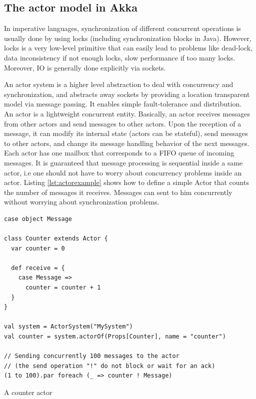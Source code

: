 \subsection{The actor model in Akka}

In imperative languages, synchronization of different concurrent operations is usually done by using locks (including synchronization blocks in Java). 
However, locks is a very low-level primitive that can easily lead to problems like dead-lock, data inconsistency if not enough locks, 
slow performance if too many locks. Moreover, IO is generally done explicitly via sockets.

An actor system is a higher level abstraction to deal with concurrency and synchronization, and abstracts away sockets by providing a location transparent model
via message passing. It enables simple fault-tolerance and distribution.
\\

An actor is a lightweight concurrent entity. Basically, an actor receives messages from other actors and send messages to other actors. Upon the reception of 
a message, it can modify its internal state (actors can be stateful), send messages to other actors, and change its message handling behavior of the next messages.
Each actor has one mailbox that corresponds to a FIFO queue of incoming messages.
It is guaranteed that message processing is sequential inside a same actor, i.e one should not have to worry about concurrency problems inside an actor. Listing
\ref{lst:actorexample} shows how to define a simple Actor that counts the number of messages it receives. Messages can sent to him concurrently without worrying
about synchronization problems.

\begin{listing}[h]
\begin{verbatim}
case object Message

class Counter extends Actor {
  var counter = 0

  def receive = {
    case Message => 
      counter = counter + 1
  }
}

val system = ActorSystem("MySystem")
val counter = system.actorOf(Props[Counter], name = "counter")

// Sending concurrently 100 messages to the actor 
// (the send operation "!" do not block or wait for an ack)
(1 to 100).par foreach (_ => counter ! Message)
\end{verbatim}
\caption{A counter actor}
\label{lst:actorexample}
\end{listing}

